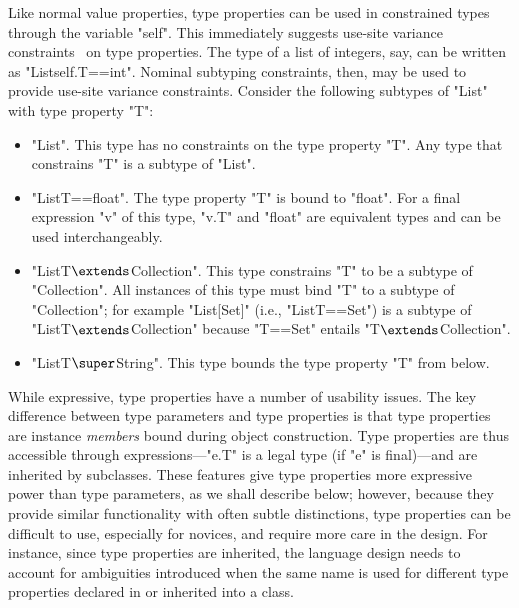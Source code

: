 Like normal value properties, type properties
can be used in constrained types through the variable \xcd"self".
%
This immediately suggests use-site variance
constraints~\cite{unifying-genericity,variant-parametric-types}
on type properties.
The type of a list of integers, say, can be written as
\xcd"List{self.T==int}".  
Nominal subtyping constraints, then, may be used to
provide use-site variance constraints.
%
Consider the following subtypes of \xcd"List" with type property
\xcd"T":
\begin{itemize}
\item \xcd"List".  This type has no constraints on the type
property \xcd"T".
Any type that constrains \xcd"T"
is a subtype of \xcd"List".

\item \xcd"List{T==float}".
The type property \xcd"T" is bound to \xcd"float".
For a final expression \xcd"v" of this type,
\xcd"v.T" and \xcd"float" are equivalent types and can be used
interchangeably.

\item \xcdmath"List{T$\extends$Collection}".
This type constrains \xcd"T" to be a subtype of \xcd"Collection".
All instances of this type must bind \xcd"T" to a subtype of
\xcd"Collection"; for example \xcd"List[Set]" (i.e.,
\xcd"List{T==Set}") is a subtype of
\xcdmath"List{T$\extends$Collection}" because \xcd"T==Set" entails
\xcdmath"T$\extends$Collection".

\item \xcdmath"List{T$\super$String}".  This type bounds the type property
\xcd"T"
from below. 
\end{itemize}

While expressive,
type properties have a number of usability issues.
The key difference between type parameters and type properties
is that type properties are
instance \emph{members} bound during object construction.  Type
properties are thus accessible through expressions---\xcd"e.T" is
a legal type (if \xcd"e" is final)---and are inherited by subclasses.
These features give type properties more expressive power than
type parameters, as we shall describe below; however, because they 
provide similar functionality with often subtle distinctions,
type properties can be difficult to use, especially for novices,
and require more care in the design.
For instance,
since type properties are inherited,
the language design needs
to account for ambiguities introduced when the same name is
used for different type properties declared in or inherited into a class.

